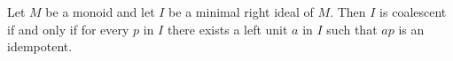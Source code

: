 Let $M$ be a monoid and let $I$ be a minimal right ideal of $M$. Then $I$ is coalescent if and only if for every $p$ in $I$ there exists a left unit $a$ in $I$ such that $ap$ is an idempotent.
